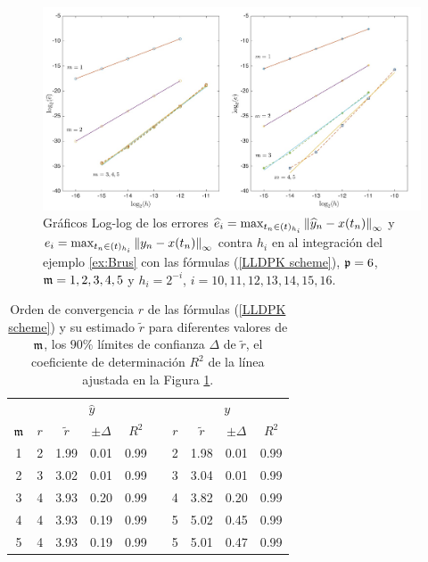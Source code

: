 \begin{figure}[htb]
	\begin{center}
		\includegraphics[scale=0.45]{Graphics/lldp/m-plots.jpg}
		\caption{Gráficos Log-log de los errores $\widehat{e}_i=\max_{t_n\in(t)_{h_i}}\left\lVert \widehat{y}_n-x(t_n) \right\rVert_\infty$ y $e_i=\max_{t_n\in(t)_{h_i}}\left\lVert y_n-x(t_n) \right\rVert_\infty$ contra $h_i$ en al integración del ejemplo \ref{ex:Brus} con las fórmulas (\ref{LLDPK scheme}), $\mathfrak{p}=6$, $\mathfrak{m}=1,2,3,4,5$ y $h_i=2^{-i}$, $i=10,11,12,13,14,15,16$.}
		\label{fig:num-exp-lldp-fix-step:Fig3}
	\end{center}
\end{figure}

\begin{table}[htb]
	\centering
	\caption{
        Orden de convergencia $r$ de las fórmulas (\ref{LLDPK scheme}) y su estimado  $\widetilde{r}$ para diferentes valores de $\mathfrak{m}$, los $90\%$ límites de confianza $\Delta$ de $\widetilde {r}$, el coeficiente de determinación $R^2$ de la línea ajustada en la Figura \ref{fig:num-exp-lldp-fix-step:Fig3}.}
		\begin{tabular}{ c  c c c c  c  c c c c}
			\hline
			& \multicolumn{4}{c}{$\widehat{y}$} & & \multicolumn{4}{c}{$y$} \\
			\cline{2-5} \cline{7-10}
			$\mathfrak{m}$ & $r$ & $\widetilde{r}$ & $\pm\varDelta$ & $R^2$ & & $r$ & $\widetilde{r}$ & $\pm\varDelta$ & $R^2$ \\
			\hline
			1 & 2 & 1.99 & 0.01 & 0.99 & & 2 & 1.98 & 0.01 & 0.99 \\
			2 & 3 & 3.02 & 0.01 & 0.99 & & 3 & 3.04 & 0.01 & 0.99 \\
			3 & 4 & 3.93 & 0.20 & 0.99 & & 4 & 3.82 & 0.20 & 0.99 \\
			4 & 4 & 3.93 & 0.19 & 0.99 & & 5 & 5.02 & 0.45 & 0.99 \\
			5 & 4 & 3.93 & 0.19 & 0.99 & & 5 & 5.01 & 0.47 & 0.99 \\
			\hline
		\end{tabular}
	\label{tab:num-exp-lldp-fix-step:morders}
\end{table}

